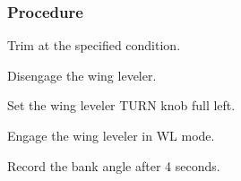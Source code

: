 % 
% 
%
 \subsubsection*{Procedure}
 \begin{compactenum}
    \item Trim at the specified condition.
    \item Disengage the wing leveler.
    \item Set the wing leveler TURN knob full left.
    \item Engage the wing leveler in WL mode.  
    \item Record the bank angle after 4 seconds.
    \end{compactenum}

